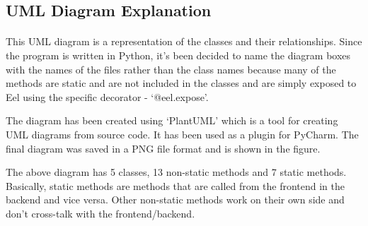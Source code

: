 \documentclass[12pt]{report}
\begin{document}
\begin{appendices}
\clearpage

\subsection*{UML Diagram Explanation}
\label{appendix:uml_explanation}
\paragraph{}
This UML diagram is a representation of the classes and their relationships. Since the program is written in Python, it's
been decided to name the diagram boxes with the names of the files rather than the class names because many of the
methods are static and are not included in the classes and are simply exposed to Eel using the specific decorator -
`@eel.expose'.

The diagram has been created using `PlantUML' which is a tool for creating UML diagrams from source code. It has been
used as a plugin for PyCharm. The final diagram was saved in a PNG file format and is shown in the figure.

The above diagram has 5 classes, 13 non-static methods and 7 static methods. Basically, static methods are methods
that are called from the frontend in the backend and vice versa. Other non-static methods work on their own side and don't cross-talk with
the frontend/backend.


\end{appendices}
\end{document}
